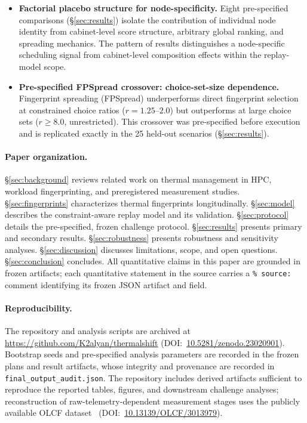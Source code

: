 \begin{itemize}
\item \textbf{Factorial placebo structure for node-specificity.}
Eight pre-specified comparisons (\S\ref{sec:results}) isolate the contribution
of individual node identity from cabinet-level score structure, arbitrary global
ranking, and spreading mechanics. The pattern of results distinguishes a
node-specific scheduling signal from cabinet-level composition effects within
the replay-model scope.

\item \textbf{Pre-specified FPSpread crossover: choice-set-size dependence.}
Fingerprint spreading (FPSpread) underperforms direct fingerprint selection at
constrained choice ratios ($r = 1.25$--$2.0$) but outperforms at large choice
sets ($r \geq 8.0$, unrestricted). This crossover was pre-specified before
execution and is replicated exactly in the 25 held-out scenarios
(\S\ref{sec:results}).

\end{itemize}

\paragraph{Paper organization.}
\S\ref{sec:background} reviews related work on thermal management in HPC,
workload fingerprinting, and preregistered measurement studies.
\S\ref{sec:fingerprints} characterizes thermal fingerprints longitudinally.
\S\ref{sec:model} describes the constraint-aware replay model and its validation.
\S\ref{sec:protocol} details the pre-specified, frozen challenge protocol.
\S\ref{sec:results} presents primary and secondary results.
\S\ref{sec:robustness} presents robustness and sensitivity analyses.
\S\ref{sec:discussion} discusses limitations, scope, and open questions.
\S\ref{sec:conclusion} concludes.
All quantitative claims in this paper are grounded in frozen artifacts; each
quantitative statement in the source carries a \texttt{\% source:} comment
identifying its frozen JSON artifact and field.

\paragraph{Reproducibility.}
The repository and analysis scripts are archived at
\url{https://github.com/K2alyan/thermalshift}
(DOI:~\href{https://doi.org/10.5281/zenodo.23020901}{10.5281/zenodo.23020901}).
Bootstrap seeds and pre-specified analysis parameters are recorded in the frozen
plans and result artifacts, whose integrity and provenance are recorded in
\texttt{final\_output\_audit.json}.
The repository includes derived artifacts sufficient to reproduce the reported
tables, figures, and downstream challenge analyses; reconstruction of
raw-telemetry-dependent measurement stages uses the publicly available OLCF
dataset~\cite{olcf-opendata}
(DOI:~\href{https://doi.org/10.13139/OLCF/3013979}{10.13139/OLCF/3013979}).
